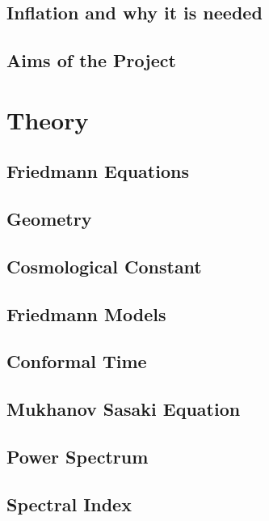 \documentclass[12pt]{article} %
\begin{document}
\subsection{Inflation and why it is needed}

\subsection{Aims of the Project}

\section{Theory}

\subsection{Friedmann Equations}

\subsection{Geometry}

\subsection{Cosmological Constant}

\subsection{Friedmann Models}

\subsection{Conformal Time}

\subsection{Mukhanov Sasaki Equation}

\subsection{Power Spectrum}

\subsection{Spectral Index}
\end{document}
